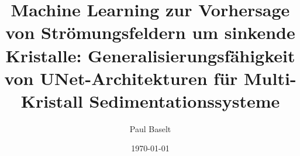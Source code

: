\documentclass[12pt,twoside,openright]{scrreprt}
\title{Machine Learning zur Vorhersage von Strömungsfeldern um sinkende Kristalle: Generalisierungsfähigkeit von UNet-Architekturen für Multi-Kristall Sedimentationssysteme}
\author{Paul Baselt}
\date{\today}
\begin{document}





\tableofcontents
\listoffigures
\listoftables
\lstlistoflistings  %










\appendix



\printbibliography
\end{document}

